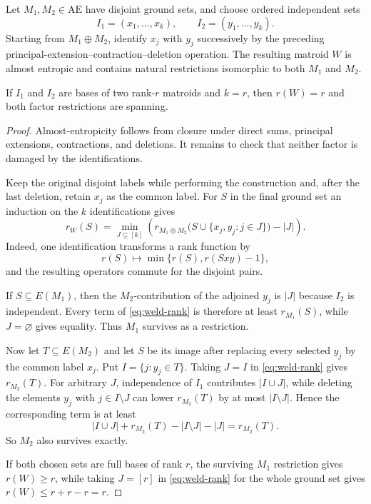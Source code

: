 \documentclass[11pt]{article}
\theoremstyle{definition}
\newcommand{\AlmostEnt}{\mathrm{AE}}
\begin{document}
\begin{proposition}\label{prop:welding}
Let $M_1,M_2\in\AlmostEnt$ have disjoint ground sets, and choose ordered independent sets
\[
I_1=(x_1,\dots,x_k),\qquad I_2=(y_1,\dots,y_k).
\]
Starting from $M_1\oplus M_2$, identify $x_j$ with $y_j$ successively by the preceding principal-extension--contraction--deletion operation.  The resulting matroid $W$ is almost entropic and contains natural restrictions isomorphic to both $M_1$ and $M_2$.

If $I_1$ and $I_2$ are bases of two rank-$r$ matroids and $k=r$, then $r(W)=r$ and both factor restrictions are spanning.
\end{proposition}
\begin{proof}
Almost-entropicity follows from closure under direct sums, principal extensions, contractions, and deletions.  It remains to check that neither factor is damaged by the identifications.

Keep the original disjoint labels while performing the construction and, after the last deletion, retain $x_j$ as the common label.  For $S$ in the final ground set an induction on the $k$ identifications gives
\begin{equation}\label{eq:weld-rank}
 r_W(S)=
 \min_{J\subseteq[k]}
 \left(
 r_{M_1\oplus M_2}
 \bigl(S\cup\{x_j,y_j:j\in J\}\bigr)-|J|
 \right).
\end{equation}
Indeed, one identification transforms a rank function by
\[
 r(S)\longmapsto \min\{r(S),r(Sxy)-1\},
\]
and the resulting operators commute for the disjoint pairs.

If $S\subseteq E(M_1)$, then the $M_2$-contribution of the adjoined $y_j$ is $|J|$ because $I_2$ is independent.  Every term of \eqref{eq:weld-rank} is therefore at least $r_{M_1}(S)$, while $J=\varnothing$ gives equality.  Thus $M_1$ survives as a restriction.

Now let $T\subseteq E(M_2)$ and let $S$ be its image after replacing every selected $y_j$ by the common label $x_j$.  Put $I=\{j:y_j\in T\}$.  Taking $J=I$ in \eqref{eq:weld-rank} gives $r_{M_2}(T)$.  For arbitrary $J$, independence of $I_1$ contributes $|I\cup J|$, while deleting the elements $y_j$ with $j\in I\setminus J$ can lower $r_{M_2}(T)$ by at most $|I\setminus J|$.  Hence the corresponding term is at least
\[
 |I\cup J|+r_{M_2}(T)-|I\setminus J|-|J|
 =r_{M_2}(T).
\]
So $M_2$ also survives exactly.

If both chosen sets are full bases of rank $r$, the surviving $M_1$ restriction gives $r(W)\ge r$, while taking $J=[r]$ in \eqref{eq:weld-rank} for the whole ground set gives $r(W)\le r+r-r=r$.
\end{proof}
\end{document}
